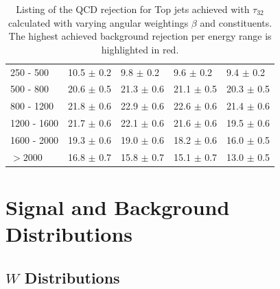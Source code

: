 \begin{table}[H]
\begin{tabular}{lllll}
\multicolumn{1}{l||}{250 - 500}      & \multicolumn{1}{l|}{\cellcolor{Red!50}10.5 $\pm$ 0.2}      	& \multicolumn{1}{l|}{9.8 $\pm$ 0.2}  					& \multicolumn{1}{l|}{9.6 $\pm$ 0.2}  & \multicolumn{1}{l|}{9.4 $\pm$ 0.2}  \\
\multicolumn{1}{l||}{500 - 800}      & \multicolumn{1}{l|}{20.6 $\pm$ 0.5}      					& \multicolumn{1}{l|}{\cellcolor{Red!50}21.3 $\pm$ 0.6} & \multicolumn{1}{l|}{21.1 $\pm$ 0.5} & \multicolumn{1}{l|}{20.3 $\pm$ 0.5} \\
\multicolumn{1}{l||}{800 - 1200}     & \multicolumn{1}{l|}{21.8 $\pm$ 0.6}      					& \multicolumn{1}{l|}{\cellcolor{Red!50}22.9 $\pm$ 0.6} & \multicolumn{1}{l|}{22.6 $\pm$ 0.6} & \multicolumn{1}{l|}{21.4 $\pm$ 0.6} \\
\multicolumn{1}{l||}{1200 - 1600}    & \multicolumn{1}{l|}{21.7 $\pm$ 0.6}      					& \multicolumn{1}{l|}{\cellcolor{Red!50}22.1 $\pm$ 0.6} & \multicolumn{1}{l|}{21.6 $\pm$ 0.6} & \multicolumn{1}{l|}{19.5 $\pm$ 0.6} \\
\multicolumn{1}{l||}{1600 - 2000}    & \multicolumn{1}{l|}{\cellcolor{Red!50}19.3 $\pm$ 0.6}      	& \multicolumn{1}{l|}{19.0 $\pm$ 0.6} 					& \multicolumn{1}{l|}{18.2 $\pm$ 0.6} & \multicolumn{1}{l|}{16.0 $\pm$ 0.5} \\
\multicolumn{1}{l||}{$>2000$}        & \multicolumn{1}{l|}{\cellcolor{Red!50}16.8 $\pm$ 0.7}      	& \multicolumn{1}{l|}{15.8 $\pm$ 0.7} 					& \multicolumn{1}{l|}{15.1 $\pm$ 0.7} & \multicolumn{1}{l|}{13.0 $\pm$ 0.5} \\ \hline
\end{tabular}
\caption{Listing of the QCD rejection for Top jets achieved with $\tau_{32}$ calculated with varying angular weightings $\beta$ and constituents. The highest achieved background rejection per energy range is highlighted in red.}\label{table:top_scan}
\end{table}


\FloatBarrier
\section{Signal and Background Distributions}\label{app:distris}
\vspace{-0.5cm}
\subsection{$W$ Distributions}
